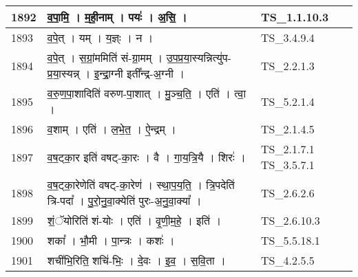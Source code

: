 \documentclass[17pt]{extarticle}
\begin{document}
\begin{longtable}{||p{0.4in}||p{4.9in}||p{0.9in}||}
    \hline
        
    1892 & व॒पा॒मि॒   ।   म॒ही॒नाम्   ।   पयः॑   ।   अ॒सि॒   ।    & TS\_1.1.10.3       \\
    
    \hline
        
    1893 & व॒पे॒त्   ।   यम्   ।   य॒ज्ञ्ः   ।   न   ।    & TS\_3.4.9.4       \\
    
    \hline
        
    1894 & व॒पे॒त्   ।   स॒ग्रां॒ममिति॑ सं{-}ग्रा॒मम्   ।   उ॒प॒प्र॒या॒स्यन्नित्यु॑प{-}प्र॒या॒स्यन्न्   ।   इ॒न्द्रा॒ग्नी इती᳚न्द्र{-}अ॒ग्नी   ।    & TS\_2.2.1.3       \\
    
    \hline
        
    1895 & व॒रु॒ण॒पा॒शादिति॑ वरुण{-}पा॒शात्   ।   मु॒ञ्च॒ति॒   ।   एति॑   ।   त्वा॒   ।    & TS\_5.2.1.4       \\
    
    \hline
        
    1896 & व॒शाम्   ।   एति॑   ।   ल॒भे॒त॒   ।   ऐ॒न्द्रम्   ।    & TS\_2.1.4.5       \\
    
    \hline
        
    1897 & व॒ष॒ट्का॒र इति॑ वषट्{-}का॒रः   ।   वै   ।   गा॒य॒त्रि॒यै   ।   शिरः॑   ।    & TS\_2.1.7.1 TS\_3.5.7.1       \\
    
    \hline
        
    1898 & व॒ष॒ट्का॒रेणेति॑ वषट्{-}का॒रेण॑   ।   स्था॒प॒य॒ति॒   ।   त्रि॒पदेति॑ त्रि{-}पदा᳚   ।   पु॒रो॒नु॒वा॒क्येति॑ पुरः{-}अ॒नु॒वा॒क्या᳚   ।    & TS\_2.6.2.6       \\
    
    \hline
        
    1899 & शं॒ॅयोरिति॑ शं{-}योः   ।   एति॑   ।   वृ॒णी॒म॒हे॒   ।   इति॑   ।    & TS\_2.6.10.3       \\
    
    \hline
        
    1900 & शका᳚   ।   भौ॒मी   ।   पा॒न्त्रः   ।   कशः॑   ।    & TS\_5.5.18.1       \\
    
    \hline
        
    1901 & शची॑भि॒रिति॒ शचि॑{-}भिः॒   ।   दे॒वः   ।   इ॒व॒   ।   स॒वि॒ता   ।    & TS\_4.2.5.5       \\
    
    \hline
        

\end{longtable}
\end{document}
